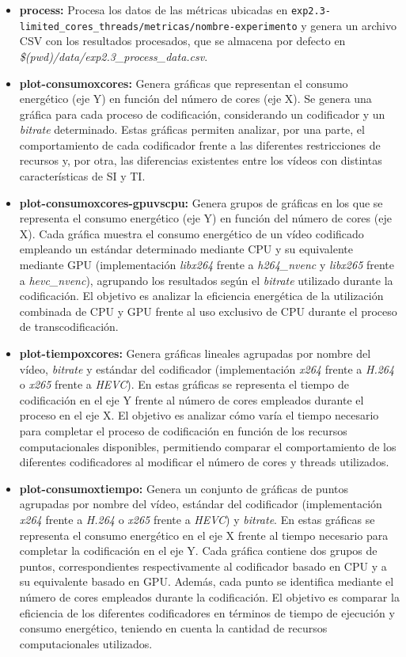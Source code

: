 \begin{itemize}

 \item \textbf{process:} Procesa los datos de las métricas ubicadas en \lstinline[language=sh]{exp2.3-limited_cores_threads/metricas/nombre-experimento} y genera un archivo CSV con los resultados procesados, que se almacena por defecto en \textit{\$(pwd)/data/exp2.3\_process\_data.csv}.
 \item \textbf{plot-consumoxcores:} Genera gráficas que representan el consumo energético (eje Y) en función del número de cores (eje X). Se genera una gráfica para cada proceso de codificación, considerando un codificador y un \textit{bitrate} determinado. Estas gráficas permiten analizar, por una parte, el comportamiento de cada codificador frente a las diferentes restricciones de recursos y, por otra, las diferencias existentes entre los vídeos con distintas características de SI y TI.
 \item \textbf{plot-consumoxcores-gpuvscpu:} Genera grupos de gráficas en los que se representa el consumo energético (eje Y) en función del número de cores (eje X). Cada gráfica muestra el consumo energético de un vídeo codificado empleando un estándar determinado mediante CPU y su equivalente mediante GPU (implementación \textit{libx264} frente a \textit{h264\_nvenc} y \textit{libx265} frente a \textit{hevc\_nvenc}), agrupando los resultados según el \textit{bitrate} utilizado durante la codificación. El objetivo es analizar la eficiencia energética de la utilización combinada de CPU y GPU frente al uso exclusivo de CPU durante el proceso de transcodificación.
 \item \textbf{plot-tiempoxcores:} Genera gráficas lineales agrupadas por nombre del vídeo, \textit{bitrate} y estándar del codificador (implementación \textit{x264} frente a \textit{H.264} o \textit{x265} frente a \textit{HEVC}). En estas gráficas se representa el tiempo de codificación en el eje Y frente al número de cores empleados durante el proceso en el eje X. El objetivo es analizar cómo varía el tiempo necesario para completar el proceso de codificación en función de los recursos computacionales disponibles, permitiendo comparar el comportamiento de los diferentes codificadores al modificar el número de cores y threads utilizados.
 \item \textbf{plot-consumoxtiempo:} Genera un conjunto de gráficas de puntos agrupadas por nombre del vídeo, estándar del codificador (implementación \textit{x264} frente a \textit{H.264} o \textit{x265} frente a \textit{HEVC}) y \textit{bitrate}. En estas gráficas se representa el consumo energético en el eje X frente al tiempo necesario para completar la codificación en el eje Y. Cada gráfica contiene dos grupos de puntos, correspondientes respectivamente al codificador basado en CPU y a su equivalente basado en GPU. Además, cada punto se identifica mediante el número de cores empleados durante la codificación. El objetivo es comparar la eficiencia de los diferentes codificadores en términos de tiempo de ejecución y consumo energético, teniendo en cuenta la cantidad de recursos computacionales utilizados.

\end{itemize}

